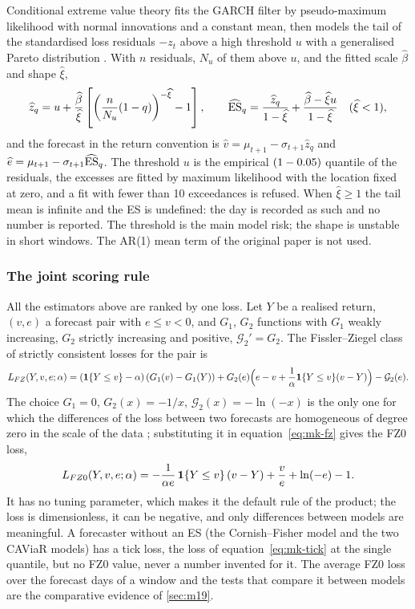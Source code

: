Conditional extreme value theory fits the GARCH filter by pseudo-maximum likelihood with normal innovations and a constant mean, then
models the tail of the standardised loss residuals $-z_t$ above a high threshold $u$ with a generalised Pareto distribution
\citep{market:mcneilfrey2000}. With $n$ residuals, $N_u$ of them above $u$, and the fitted scale $\widehat\beta$ and shape $\widehat\xi$,
\begin{equation}
\widehat z_q=u+\frac{\widehat\beta}{\widehat\xi}\left[\left(\frac n{N_u}(1-q)\right)^{-\widehat\xi}-1\right],\qquad
\widehat{\operatorname{ES}}_q=\frac{\widehat z_q}{1-\widehat\xi}+\frac{\widehat\beta-\widehat\xi u}{1-\widehat\xi}\quad(\widehat\xi<1),
\label{eq:mk-evt}
\end{equation}
and the forecast in the return convention is $\widehat v=\mu_{t+1}-\sigma_{t+1}\widehat z_q$ and $\widehat e=\mu_{t+1}-\sigma_{t+1}\widehat{\operatorname{ES}}_q$.
The threshold $u$ is the empirical $(1-0.05{})$ quantile of the residuals, the excesses are fitted by maximum likelihood with the
location fixed at zero, and a fit with fewer than 10 exceedances is refused. When $\widehat\xi\ge1$ the tail mean is infinite and the
ES is undefined: the day is recorded as such and no number is reported. The threshold is the main model risk; the shape is unstable
in short windows. The AR(1) mean term of the original paper is not used.

\subsubsection{The joint scoring rule}
All the estimators above are ranked by one loss. Let $Y$ be a realised return, $(v,e)$ a forecast pair with $e\le v<0$, and $G_1$,
$G_2$ functions with $G_1$ weakly increasing, $G_2$ strictly increasing and positive, $\mathcal G_2'=G_2$. The Fissler--Ziegel class of
strictly consistent losses for the pair \citep{market:fisslerziegel2016,market:pattonziegelchen2019} is
\begin{equation}
L_{FZ}(Y,v,e;\alpha)=\left(\mathbf{1}\{Y\le v\}-\alpha\right)\left(G_1(v)-G_1(Y)\right)+G_2(e)\Big(e-v+\frac1\alpha\mathbf{1}\{Y\le v\}(v-Y)\Big)-\mathcal G_2(e).
\label{eq:mk-fz}
\end{equation}
The choice $G_1=0$, $G_2(x)=-1/x$, $\mathcal G_2(x)=-\ln(-x)$ is the only one for which the differences of the loss between two forecasts
are homogeneous of degree zero in the scale of the data \citep{market:pattonziegelchen2019}; substituting it in
equation~\eqref{eq:mk-fz} gives the FZ0 loss,
\begin{equation}
L_{FZ0}(Y,v,e;\alpha)=-\frac1{\alpha e}\,\mathbf{1}\{Y\le v\}\,(v-Y)+\frac ve+\ln(-e)-1.
\label{eq:mk-fz0}
\end{equation}
It has no tuning parameter, which makes it the default rule of the product; the loss is dimensionless, it can be negative, and only
differences between models are meaningful. A forecaster without an ES (the Cornish--Fisher model and the two CAViaR models) has a tick
loss, the loss of equation~\eqref{eq:mk-tick} at the single quantile, but no FZ0 value, never a number invented for it. The average FZ0 loss over
the forecast days of a window and the tests that compare it between models are the comparative evidence of \cref{sec:m19}.

